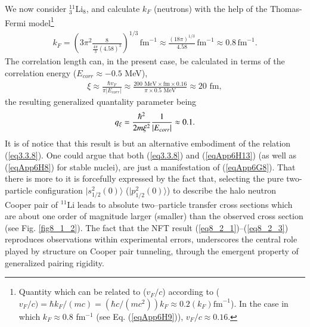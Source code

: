 \begin{subappendices}
We now consider $^{11}_3$Li$_8$, and calculate $k_F$ (neutrons) with the help of the Thomas-Fermi model\footnote{\label{fnC655} Quantity which can be related to ($v_F/c$) according to   ($v_F/c)=\hbar k_F/(mc)=(\hbar c/(mc^2))k_F\approx0.2(k_F)\text{fm}^{-1}$). In the case in which $k_F\approx 0.8 $ fm$^{-1}$ (see Eq. (\ref{eqApp6H9})),  $v_F/c\approx 0.16$. }
\begin{align}\label{eqApp6H9}
k_F=\left(3\pi^2\frac{8}{\frac{4\pi}{3}(4.58)^3}\right)^{1/3}\,\text{fm}^{-1}\approx\frac{(18\pi)^{1/3}}{4.58}\,\text{fm}^{-1}\approx 0.8\,\text{fm}^{-1}.
\end{align} 
The correlation length can, in the present case, be calculated in terms of the correlation energy ($E_{corr}\approx-0.5$ MeV), 
\begin{align}
\xi\approx \frac{\hbar v_F}{\pi|E_{corr}|}\approx \frac{200 \text{ MeV}\times\text{fm}\times0.16}{\pi\times 0.5\text{ MeV}}\approx 20\text{ fm},
\end{align}
 the resulting generalized quantality parameter being
\begin{align}\label{eqApp6H13}
q_\xi=\frac{\hbar^2}{2m\xi^2}\frac{1}{|E_{corr}|}\approx 0.1. \idx{Cooper pair!generalized quantality parameter}
\end{align}
It is of notice that this result is but an alternative embodiment of the relation (\ref{eq3.3.8}). One could argue that both (\ref{eq3.3.8}) and (\ref{eqApp6H13}) (as well as (\ref{eqApp6H8}) for stable nuclei), are just a manifestation of (\ref{eqApp6G8}). That there is more to it is forcefully expressed by the fact that, selecting the pure two-particle configuration $|s_{1/2}^2(0)\rangle$ ($|p_{1/2}^2(0)\rangle$) to describe the halo neutron Cooper pair of $^{11}$Li leads to absolute two--particle transfer cross sections which are about one order of magnitude larger (smaller) than the observed cross section (see Fig. \ref{fig8_1_2}). The fact that the NFT result (\ref{eq8_2_1})--(\ref{eq8_2_3}) reproduces observations within experimental errors, underscores the central role played by structure on Cooper pair tunneling, through the emergent property of generalized pairing rigidity.




\end{subappendices}
